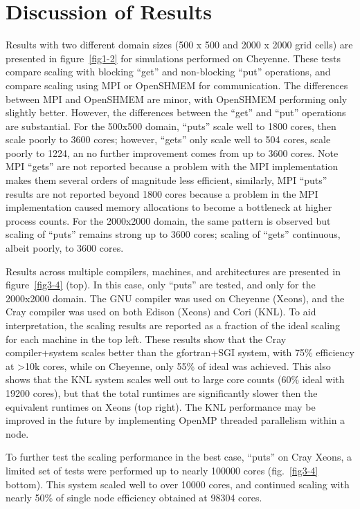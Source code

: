 \section{Discussion of Results}
Results with two different domain sizes (500 x 500 and 2000 x 2000 grid cells) are presented in figure~\ref{fig1-2} for simulations performed on Cheyenne.
These tests compare scaling with blocking ``get'' and non-blocking ``put'' operations, and compare scaling using MPI or OpenSHMEM for communication.
The differences between MPI and OpenSHMEM are minor, with OpenSHMEM performing only slightly better.
However, the differences between the ``get'' and ``put'' operations are substantial.
For the 500x500 domain, ``puts'' scale well to 1800 cores, then scale poorly to \num{3600} cores;
however, ``gets'' only scale well to \num{504} cores, scale poorly to \num{1224}, an no further improvement comes from up to \num{3600} cores.
Note MPI ``gets'' are not reported because a problem with the MPI implementation makes them several orders of magnitude less efficient,
similarly, MPI ``puts'' results are not reported beyond \num{1800} cores because a problem in the MPI implementation caused memory allocations to become a bottleneck at higher process counts.
For the 2000x2000 domain, the same pattern is observed but scaling of ``puts'' remains strong up to 3600 cores;
scaling of ``gets'' continuous, albeit poorly, to \num{3600} cores.

Results across multiple compilers, machines, and architectures are presented in figure~\ref{fig3-4} (top).
In this case, only ``puts'' are tested, and only for the 2000x2000 domain.
The GNU compiler was used on Cheyenne (Xeons), and the Cray compiler was used on both Edison (Xeons) and Cori (KNL).
To aid interpretation, the scaling results are reported as a fraction of the ideal scaling for each machine in the top left.
These results show that the Cray compiler+system scales better than the gfortran+SGI system,
with 75\% efficiency at >10k cores, while on Cheyenne, only 55\% of ideal was achieved.
This also shows that the KNL system scales well out to large core counts (60\% ideal with \num{19200} cores),
but that the total runtimes are significantly slower then the equivalent runtimes on Xeons (top right).
The KNL performance may be improved in the future by implementing OpenMP threaded parallelism within a node.

To further test the scaling performance in the best case, ``puts'' on Cray Xeons, a limited set of tests were performed up to nearly \num{100000} cores (fig.~\ref{fig3-4} bottom).
This system scaled well to over \num{10000} cores, and continued scaling with nearly 50\% of single node efficiency obtained at \num{98304} cores.

